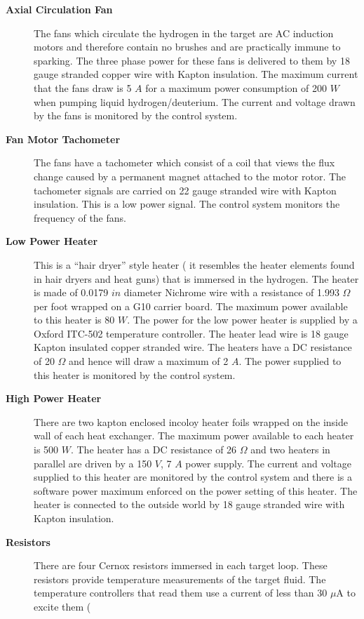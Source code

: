 \begin{safetyen}{10}{5}
{\begin{description}
\item[{\bf Axial Circulation Fan}] The fans which 
circulate the hydrogen in the target are AC induction motors
and therefore contain no brushes and are practically immune to sparking.
The three phase power for these fans is delivered to them by 18
gauge stranded copper wire with Kapton insulation.
The maximum current that 
the fans draw is 5 $A$ for a maximum power consumption of
200 $W$ when pumping liquid hydrogen/deuterium. The current and voltage drawn
by the fans is monitored by the control system.
\item[{\bf Fan Motor Tachometer}]
The fans have a tachometer which consist of a
coil that views the flux change caused by a permanent magnet attached to 
the motor rotor. The tachometer signals are carried on 22 gauge stranded wire
with Kapton insulation. This is a low power signal. The control system
monitors the frequency of the fans.
\item[{\bf Low Power Heater}] This is a ``hair dryer'' style heater ( it 
resembles the heater elements found in hair dryers and heat guns) that
is immersed in the hydrogen. The heater is made of 0.0179 $in$ diameter
Nichrome wire with a resistance of 1.993 $\Omega$ per foot wrapped
on a G10 carrier board.
The maximum power available to this
heater is 80 $W$. The power for the low power heater is supplied by
a Oxford ITC-502 temperature controller. The heater lead wire is
18 gauge Kapton insulated copper stranded wire. The heaters have a
DC resistance of 20 $\Omega$ and hence will draw a maximum of 2 $A$. 
The power supplied to this heater is monitored by the control system.
\item[{\bf High Power Heater}]There are two kapton enclosed incoloy heater foils
wrapped on the inside wall of each heat exchanger.
The maximum power available to each
heater is  500 $W$. The heater has a DC resistance of
26 $\Omega$ and two heaters in parallel
are driven by a 150 $V$, 7 $A$ power supply.
The current and voltage supplied to this heater are monitored by the control
system and there
is a software power maximum enforced on the power setting
of this heater. 
The heater is connected to
the outside world by 18 gauge stranded wire with Kapton insulation.
\item[{\bf Resistors}] There are four Cernox
resistors immersed in each target loop. These resistors provide temperature
measurements of the target fluid. The temperature controllers that
read them use a current of less than 30 $\mu$A to excite them (

\end{description}}
\end{safetyen}
